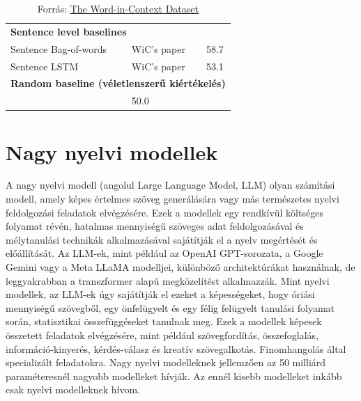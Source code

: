 \documentclass[12pt]{report}
\theoremstyle{definition}
\begin{document}
\begin{table}[h]
\begin{tabular}{l l c}
        \midrule
        \multicolumn{3}{l}{\textbf{Sentence level baselines}} \\
        Sentence Bag-of-words & WiC's paper & 58.7 \\
        Sentence LSTM & WiC's paper & 53.1 \\
        \midrule
        \multicolumn{3}{l}{\textbf{Random baseline (véletlenszerű kiértékelés)}} \\
        & 50.0 \\
        \bottomrule
    \end{tabular}
    	\caption{Forrás: \href{https://pilehvar.github.io/wic/}{The Word-in-Context Dataset}}

    \label{tab:state_of_the_art}
\end{table}


\clearpage


\section{Nagy nyelvi modellek}

A nagy nyelvi modell (angolul Large Language Model, LLM) olyan számítási modell, amely képes értelmes szöveg generálására vagy más természetes nyelvi feldolgozási feladatok elvégzésére. Ezek a modellek egy rendkívül költséges folyamat révén, hatalmas mennyiségű szöveges adat feldolgozásával és mélytanulási technikák alkalmazásával sajátítják el a nyelv megértését és előállítását. Az LLM-ek, mint például az OpenAI GPT-sorozata, a Google Gemini vagy a Meta LLaMA modelljei, különböző architektúrákat használnak, de leggyakrabban a transzformer alapú megközelítést alkalmazzák. Mint nyelvi modellek, az LLM-ek úgy sajátítják el ezeket a képességeket, hogy óriási mennyiségű szövegből, egy önfelügyelt és egy félig felügyelt tanulási folyamat során, statisztikai összefüggéseket tanulnak meg. Ezek a modellek  képesek összetett feladatok elvégzésére, mint például szövegfordítás, összefoglalás, információ-kinyerés, kérdés-válasz és kreatív szövegalkotás. Finomhangolás által specializált feladatokra. Nagy nyelvi modelleknek jellemzően az 50 milliárd paraméteresnél nagyobb modelleket hívják. Az ennél kisebb modelleket inkább csak nyelvi modelleknek hívom.
\end{document}
